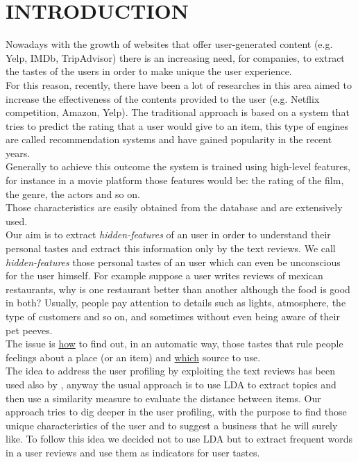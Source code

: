 \documentclass[a4paper, 10pt, conference]{ieeeconf}      %
\begin{document}
\section{INTRODUCTION}
Nowadays with the growth of websites that offer user-generated content (e.g. Yelp, IMDb, TripAdvisor) there is an increasing need, for companies, to extract the tastes of the users in order to make unique the user experience.\\
For this reason, recently, there have been a lot of researches in this area aimed to increase the effectiveness of the contents provided to the user (e.g. Netflix competition\cite{netflix}, Amazon, Yelp\cite{altroYelp}).
The traditional approach is based on a system that tries to predict the rating that a user would give to an item, this type of engines are called recommendation systems and have gained popularity in the recent years.\\
Generally to achieve this outcome the system is trained using high-level features, for instance in a movie platform those features would be: the rating of the film, the genre, the actors and so on.\\
Those characteristics are easily obtained from the database and are extensively used.\\
Our aim is to extract \textit{hidden-features} of an user in order to understand their personal tastes and extract this information only by the text reviews.
We call \textit{hidden-features} those personal tastes of an user which can even be unconscious for the user himself. 
For example suppose a user writes reviews of mexican restaurants, why is one restaurant better than another although the food is good in both? Usually, people pay attention to details such as lights, atmosphere, the type of customers and so on, and sometimes without even being aware of their pet peeves.\\
The issue is \underline{how} to find out, in an automatic way, those tastes that rule people feelings about a place (or an item) and \underline{which} source to use.\\
The idea to address the user profiling by exploiting the text reviews has been used also by \cite{rev}, anyway the usual approach is to use LDA to extract topics and then use a similarity measure to evaluate the distance between items. Our approach tries to dig deeper in the user profiling, with the purpose to find those unique characteristics of the user and to suggest a business that he will surely like. To follow this idea we decided not to use LDA but to extract frequent words in a  user reviews and use them as indicators for user tastes.\\
\end{document}
